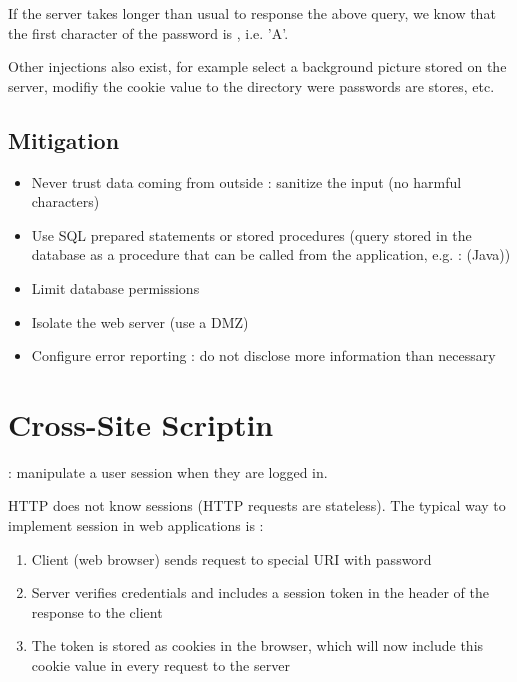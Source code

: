 
If the server takes longer than usual to response the above query, we know that the first character of the password is , i.e. 'A'.

Other injections also exist, for example select a background picture stored on the server, modifiy the cookie value to the directory were passwords are stores, etc.

\section{Mitigation}

\begin{itemize}
    \item Never trust data coming from outside : sanitize the input (no harmful characters)
    \item Use SQL prepared statements or stored procedures (query stored in the database as a procedure that can be called from the application, e.g. :  (Java))
    \item Limit database permissions
    \item Isolate the web server (use a DMZ)
    \item Configure error reporting : do not disclose more information than necessary
\end{itemize}

\chapter{Cross-Site Scriptin}

 : manipulate a user session when they are logged in.

HTTP does not know sessions (HTTP requests are stateless). The typical way to implement session in web applications is :
\begin{enumerate}
    \item Client (web browser) sends request to special URI with password
    \item Server verifies credentials and includes a session token in the header of the response to the client
    \item The token is stored as cookies in the browser, which will now include this cookie value in every request to the server
\end{enumerate}

